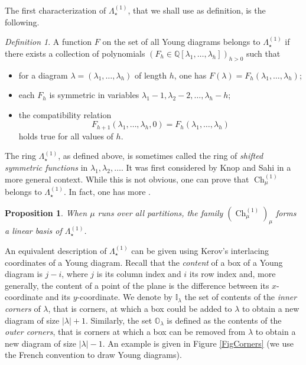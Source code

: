 \documentclass[11pt]{amsart}
\theoremstyle{plain}
\newtheorem{proposition}[lemma]{Proposition}
\theoremstyle{remark}
\newtheorem{definition}[lemma]{Definition}
\newcommand{\II}{\mathbb{I}}
\newcommand{\OO}{\mathbb{O}}
\newcommand{\QQ}{\mathbb{Q}}
\newcommand{\Polun}{\Lambda_\star^{(1)}}
\DeclareMathOperator{\Ch}{Ch}
\begin{document}
The first characterization of $\Polun$,
that we shall use as definition, is the following.
\begin{definition}\label{def:polynomial}
    A function $F$ on the set of all Young diagrams belongs to $\Polun$
    if there exists a collection of polynomials
$\left(F_h \in \QQ[\lambda_1,\dots,\lambda_h]\right)_{h > 0}$ such that 
\begin{itemize}
    \item for a diagram $\lambda=(\lambda_1,\dots,\lambda_h)$ of length $h$,
        one has $F(\lambda)=F_h(\lambda_1,\ldots,\lambda_h)$;
    \item each $F_h$ is symmetric in variables
$\lambda_1 - 1, \lambda_2 -2, \ldots ,\lambda_h-h$; 
\item the compatibility
relation
\[F_{h+1}(\lambda_1,\dots,\lambda_h,0) = F_h(\lambda_1,\dots,\lambda_h)\]
holds true for all values of $h$.
\end{itemize}    
\end{definition}
The ring $\Polun$, as defined above, is sometimes called
the ring of \emph{shifted symmetric functions} in $\lambda_1, \lambda_2,\ldots$.
It was first considered by Knop and Sahi \cite{KnopSahiShiftedSym} in a more general context.
While this is not obvious, 
one can prove that $\Ch^{(1)}_\mu$ belongs to $\Polun$.
In fact, one has more \cite[Section 3]{KerovOlshanskiPolFunc}.
\begin{proposition}
    When $\mu$ runs over all partitions,
    the family $(\Ch^{(1)}_\mu)_\mu$ forms a linear basis of $\Polun$.
\end{proposition}

An equivalent description of $\Polun$
can be given using Kerov's interlacing coordinates of a Young diagram.
Recall that the \emph{content} of a box of a Young diagram is $j-i$, where $j$ is its column
index and $i$ its row index and, more generally, the content of a point of the plane is 
the difference between its $x$-coordinate and its $y$-coordinate.
We denote by $\II_\lambda$ the set of contents of the \emph{inner corners} of $\lambda$, that is
corners, at which a box could be added to $\lambda$ to obtain a new diagram of size $|\lambda|+1$.
Similarly, the set $\OO_\lambda$ is defined as the contents of the \emph{outer corners}, that is corners at which a box can be removed from $\lambda$ to obtain a new diagram of size $|\lambda|-1$.
An example is given in Figure \ref{FigCorners} (we use the French convention to draw Young diagrams).
\end{document}
